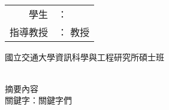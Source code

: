 \begin{titlepage}
  \begin{center}
  	\LARGE 
    \begin{singlespace}    
      \textbf{\chineseTitle{}} \\[0.5cm]
    \end{singlespace}
    
    \begin{singlespace}    
    \begin{tabular}{r l}
    	學生     & ：\studentCnName{}  \\
        指導教授  & ：\advisorCnName{} \hspace{0.1cm} 教授 \\[0.5cm]
    \end{tabular}
    \end{singlespace}

    國立交通大學資訊科學與工程研究所碩士班 \\[0.5cm]
     \\[0.5cm]
    	
  \end{center}
  \normalsize 
  \hspace{0.6cm} 摘要內容
  \\[0.7cm]
  關鍵字：關鍵字們
\end{titlepage}